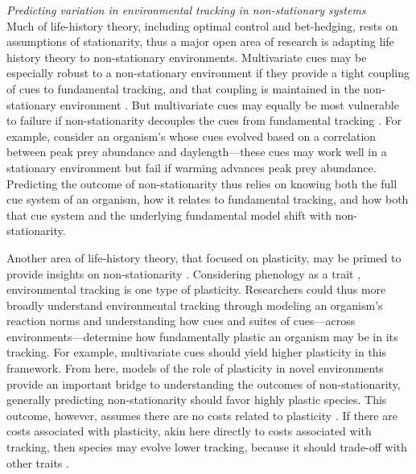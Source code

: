 \documentclass[11pt,letterpaper]{article}
\begin{document}
\emph{Predicting variation in environmental tracking in non-stationary systems}\\
Much of life-history theory, including optimal control and bet-hedging, rests on assumptions of stationarity, thus a major open area of research is adapting life history theory to non-stationary environments. Multivariate cues may be especially robust to a non-stationary environment if they provide a tight coupling of cues to fundamental tracking, and that coupling is maintained in the non-stationary environment \citep{dore2018}. But multivariate cues may equally be most vulnerable to failure if non-stationarity decouples the cues from fundamental tracking \citep{bonamour2019}. For example, consider an organism's whose cues evolved based on a correlation between peak prey abundance and daylength---these cues may work well in a stationary environment but fail if warming advances peak prey abundance. Predicting the outcome of non-stationarity thus relies on knowing both the full cue system of an organism, how it relates to fundamental tracking, and how both that cue system and the underlying fundamental model shift with non-stationarity. 

Another area of life-history theory, that focused on plasticity, may be primed to provide insights on non-stationarity \citep[or `sustained environmental change,' see][]{chevin2010}. Considering phenology as a trait \citep[as we and others do, e.g.,][]{charm2008,nicotra2010,inouye2019}, environmental tracking is one type of plasticity. Researchers could thus more broadly understand environmental tracking through modeling an organism's reaction norms \citep{pigluicci1998,chmura2019} and understanding how cues and suites of cues---across environments---determine how fundamentally plastic an organism may be in its tracking. For example, multivariate cues should yield higher plasticity in this framework. From here, models of the role of plasticity in novel environments provide an important bridge to understanding the outcomes of non-stationarity, generally predicting non-stationarity should favor highly plastic species. This outcome, however, assumes there are no costs related to plasticity \citep{Ghalambor2007,tufto2015}. If there are costs associated with plasticity, akin here directly to costs associated with tracking, then species may evolve lower tracking, because it should trade-off with other traits \citep{auld2010}. 
\end{document}
